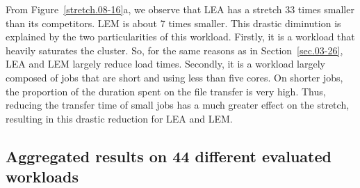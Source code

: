 \documentclass[conference,10pt]{IEEEtran}
\begin{document}
From Figure~\ref{stretch.08-16}a, we observe that LEA has a stretch 33 times smaller than
its competitors. LEM is about 7 times smaller. This drastic diminution is explained
by the two particularities of this workload.
Firstly, it is a workload that heavily saturates the cluster.
So, for the same reasons as in Section~\ref{sec.03-26}, LEA and LEM largely reduce load times.
Secondly, it is a workload largely composed of jobs that are short and using less than five cores.
On shorter jobs, the proportion of the duration spent on the file transfer is very high. 
Thus, reducing the transfer time of small jobs has a much greater effect on the stretch, resulting in this 
drastic reduction for LEA and LEM.

\subsection{Aggregated results on 44 different evaluated workloads}
\end{document}
